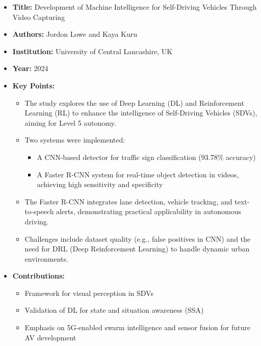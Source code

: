 \begin{itemize}
    \item \textbf{Title:} Development of Machine Intelligence for Self-Driving Vehicles Through Video Capturing \cite{lowe2024development}
    \item \textbf{Authors:} Jordon Lowe and Kaya Kuru
    \item \textbf{Institution:} University of Central Lancashire, UK
    \item \textbf{Year:} 2024
    \item \textbf{Key Points:}
    \begin{itemize}
        \item The study explores the use of Deep Learning (DL) and Reinforcement Learning (RL) to enhance the intelligence of Self-Driving Vehicles (SDVs), aiming for Level 5 autonomy.
        \item Two systems were implemented:
        \begin{itemize}
            \item A CNN-based detector for traffic sign classification (93.78\% accuracy)
            \item A Faster R-CNN system for real-time object detection in videos, achieving high sensitivity and specificity
        \end{itemize}
        \item The Faster R-CNN integrates lane detection, vehicle tracking, and text-to-speech alerts, demonstrating practical applicability in autonomous driving.
        \item Challenges include dataset quality (e.g., false positives in CNN) and the need for DRL (Deep Reinforcement Learning) to handle dynamic urban environments.
    \end{itemize}
    \item \textbf{Contributions:}
    \begin{itemize}
        \item Framework for visual perception in SDVs
        \item Validation of DL for state and situation awareness (SSA)
        \item Emphasis on 5G-enabled swarm intelligence and sensor fusion for future AV development
    \end{itemize}
\end{itemize}

